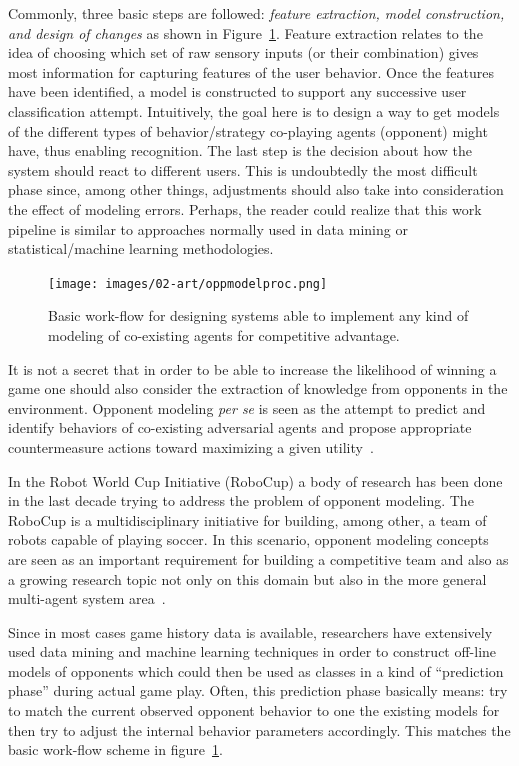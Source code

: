 Commonly, three basic steps are followed: \textit{feature extraction, model construction, and design of changes} as shown in Figure~\ref{behaviorModWorkFlow}. Feature extraction relates to the idea of choosing which set of raw sensory inputs (or their combination) gives most information for capturing features of the user behavior. Once the features have been identified, a model is constructed to support any successive user classification attempt. Intuitively, the goal here is to design a way to get models of the different types of behavior/strategy co-playing agents (opponent) might have, thus enabling recognition. The last step is the decision about how the system should react to different users. This is undoubtedly the most difficult phase since, among other things, adjustments should also take into consideration the effect of modeling errors. Perhaps, the reader could realize that this work pipeline is similar to approaches normally used in data mining or statistical/machine learning methodologies.

\begin{figure}[htp]
  \centering  
  \texttt{[image: images/02-art/oppmodelproc.png]}
  \caption{Basic work-flow for designing systems able to implement any kind of modeling of co-existing agents for competitive advantage.}
   \label{behaviorModWorkFlow}
\end{figure}

It is not a secret that in order to be able to increase the likelihood of winning a game one should also consider the extraction of knowledge from opponents in the environment. Opponent modeling \textit{per se} is seen as the attempt to predict and identify behaviors of co-existing adversarial agents and propose appropriate countermeasure actions toward maximizing a given utility~\citep{fathzadeh_opponent_2007}.

In the Robot World Cup Initiative (RoboCup) a body of research has been done in the last decade trying to address the problem of opponent modeling. The RoboCup is a multidisciplinary initiative for building, among other, a team of robots capable of playing soccer. In this scenario, opponent modeling concepts are seen as an important requirement for building a competitive team and also as a growing research topic not only on this domain but also in the more general multi-agent system area~\citep{rofer_overview_2012}. 

Since in most cases game history data is available, researchers have extensively used data mining and machine learning techniques in order to construct off-line models of opponents which could then be used as classes in a kind of ``prediction phase'' during actual game play. Often, this prediction phase basically means: try to match the current observed opponent behavior to one the existing models for then try to adjust the internal behavior parameters accordingly. This matches the basic work-flow scheme in figure~\ref{behaviorModWorkFlow}.

